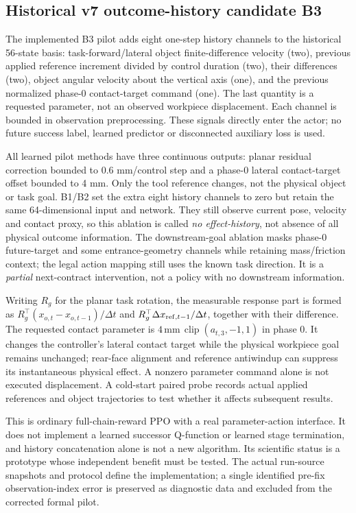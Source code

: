 \subsection{Historical v7 outcome-history candidate B3}
The implemented B3 pilot adds eight one-step history channels to the historical 56-state basis: task-forward/lateral object finite-difference velocity (two), previous applied reference increment divided by control duration (two), their differences (two), object angular velocity about the vertical axis (one), and the previous normalized phase-0 contact-target command (one). The last quantity is a requested parameter, not an observed workpiece displacement. Each channel is bounded in observation preprocessing. These signals directly enter the actor; no future success label, learned predictor or disconnected auxiliary loss is used.

All learned pilot methods have three continuous outputs: planar residual correction bounded to 0.6 mm/control step and a phase-0 lateral contact-target offset bounded to 4 mm. Only the tool reference changes, not the physical object or task goal. B1/B2 set the extra eight history channels to zero but retain the same 64-dimensional input and network. They still observe current pose, velocity and contact proxy, so this ablation is called \emph{no effect-history}, not absence of all physical outcome information. The downstream-goal ablation masks phase-0 future-target and some entrance-geometry channels while retaining mass/friction context; the legal action mapping still uses the known task direction. It is a \emph{partial} next-contract intervention, not a policy with no downstream information.

Writing $R_g$ for the planar task rotation, the measurable response part is formed as $R_g^\top(x_{o,t}-x_{o,t-1})/\Delta t$ and $R_g^\top\Delta x_{{\rm ref},t-1}/\Delta t$, together with their difference. The requested contact parameter is $4\,\mathrm{mm}\,\operatorname{clip}(a_{t,3},-1,1)$ in phase 0. It changes the controller's lateral contact target while the physical workpiece goal remains unchanged; rear-face alignment and reference antiwindup can suppress its instantaneous physical effect. A nonzero parameter command alone is not executed displacement. A cold-start paired probe records actual applied references and object trajectories to test whether it affects subsequent results.

This is ordinary full-chain-reward PPO with a real parameter-action interface. It does not implement a learned successor Q-function or learned stage termination, and history concatenation alone is not a new algorithm. Its scientific status is a prototype whose independent benefit must be tested. The actual run-source snapshots and protocol define the implementation; a single identified pre-fix observation-index error is preserved as diagnostic data and excluded from the corrected formal pilot.

